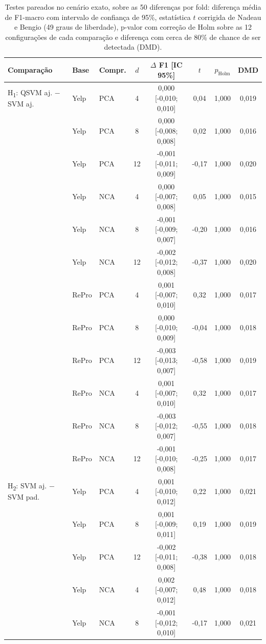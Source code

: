 \begin{table}[t]
\centering
\caption{Testes pareados no cenário exato, sobre as 50 diferenças por fold: diferença média de F1-macro com intervalo de confiança de 95\%, estatística $t$ corrigida de Nadeau e Bengio (49 graus de liberdade), p-valor com correção de Holm sobre as 12 configurações de cada comparação e diferença com cerca de 80\% de chance de ser detectada (DMD).}
\label{tab:testes}
\footnotesize
\begin{tabular}{lllccccc}
\toprule
Comparação & Base & Compr. & $d$ & $\Delta$ F1 [IC 95\%] & $t$ & $p_{\mathrm{Holm}}$ & DMD \\
\midrule
H\textsubscript{1}: QSVM aj. $-$ SVM aj. & Yelp & PCA & 4 & 0,000 [-0,010; 0,010] & 0,04 & 1,000 & 0,019 \\
 & Yelp & PCA & 8 & 0,000 [-0,008; 0,008] & 0,02 & 1,000 & 0,016 \\
 & Yelp & PCA & 12 & -0,001 [-0,011; 0,009] & -0,17 & 1,000 & 0,020 \\
 & Yelp & NCA & 4 & 0,000 [-0,007; 0,008] & 0,05 & 1,000 & 0,015 \\
 & Yelp & NCA & 8 & -0,001 [-0,009; 0,007] & -0,20 & 1,000 & 0,016 \\
 & Yelp & NCA & 12 & -0,002 [-0,012; 0,008] & -0,37 & 1,000 & 0,020 \\
 & RePro & PCA & 4 & 0,001 [-0,007; 0,010] & 0,32 & 1,000 & 0,017 \\
 & RePro & PCA & 8 & 0,000 [-0,010; 0,009] & -0,04 & 1,000 & 0,018 \\
 & RePro & PCA & 12 & -0,003 [-0,013; 0,007] & -0,58 & 1,000 & 0,019 \\
 & RePro & NCA & 4 & 0,001 [-0,007; 0,010] & 0,32 & 1,000 & 0,017 \\
 & RePro & NCA & 8 & -0,003 [-0,012; 0,007] & -0,55 & 1,000 & 0,018 \\
 & RePro & NCA & 12 & -0,001 [-0,010; 0,008] & -0,25 & 1,000 & 0,017 \\
\midrule
H\textsubscript{2}: SVM aj. $-$ SVM pad. & Yelp & PCA & 4 & 0,001 [-0,010; 0,012] & 0,22 & 1,000 & 0,021 \\
 & Yelp & PCA & 8 & 0,001 [-0,009; 0,011] & 0,19 & 1,000 & 0,019 \\
 & Yelp & PCA & 12 & -0,002 [-0,011; 0,008] & -0,38 & 1,000 & 0,018 \\
 & Yelp & NCA & 4 & 0,002 [-0,007; 0,012] & 0,48 & 1,000 & 0,018 \\
 & Yelp & NCA & 8 & -0,001 [-0,012; 0,010] & -0,17 & 1,000 & 0,021 \\

\end{tabular}
\end{table}
